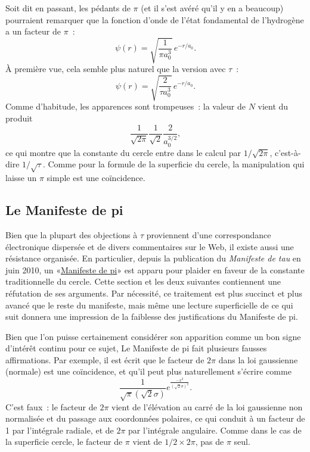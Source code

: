 Soit dit en passant, les pédants de $\pi$ (et il s'est avéré qu'il y en a beaucoup) pourraient
remarquer que la fonction d'onde de l'état fondamental de l'hydrogène a un
facteur de $\pi$~:
\[
\psi(r) = \sqrt{\frac{1}{\pi a_0^3}}\,e^{-r/a_0}.
\]
À première vue, cela semble plus naturel que la version avec $\tau$~:
\[
\psi(r) = \sqrt{\frac{2}{\tau a_0^3}}\,e^{-r/a_0}.
\]
Comme d'habitude, les apparences sont trompeuses~: la valeur de $N$ vient du
produit
\[
\frac{1}{\sqrt{2\pi}} \frac{1}{\sqrt{2}} \frac{2}{a_0^{3/2}},
\]
ce qui montre que la constante du cercle entre dans le calcul par
$1/\sqrt{2\pi}$, c'est-à-dire $1/\sqrt{\tau}$. Comme pour la formule de la
superficie du cercle, la manipulation qui laisse un $\pi$ simple est une
coïncidence.


  \subsection{Le Manifeste de pi} %
  \label{sec:the_pi_manifesto_a_rebuttal}

Bien que la plupart des objections à $\tau$ proviennent d'une correspondance
électronique dispersée et de divers commentaires sur le Web, il existe aussi une
résistance organisée. En particulier, depuis la publication du \emph{Manifeste
de tau} en juin 2010, un «\ns \href{http://thepimanifesto.com/}{Manifeste de
pi}\ns » est apparu pour plaider en faveur de la constante traditionnelle du
cercle. Cette section et les deux suivantes contiennent une réfutation de ses
arguments. Par nécessité, ce traitement est plus succinct et plus avancé que le
reste du manifeste, mais même une lecture superficielle de ce qui suit donnera
une impression de la faiblesse des justifications du Manifeste de pi.

Bien que l'on puisse certainement considérer son apparition
comme un bon signe d'intérêt continu pour ce sujet, Le Manifeste de pi fait plusieurs fausses
affirmations. Par exemple, il est écrit que le facteur de $2\pi$ dans la loi
gaussienne (normale) est une coïncidence, et qu'il peut plus naturellement
s'écrire comme
\[
\frac{1}{\sqrt\pi(\sqrt 2\sigma)}e^{\frac{-x^2}{(\sqrt 2\sigma)^2}}.
\]
C'est faux~: le facteur de $2\pi$ vient de l'élévation au carré de la loi
gaussienne non normalisée et du passage aux coordonnées polaires, ce qui conduit
à un facteur de 1 par l'intégrale radiale, et de $2\pi$ par l'intégrale angulaire. Comme
dans le cas de la superficie cercle, le facteur de $\pi$ vient de $1/2\times
2\pi$, pas de $\pi$ seul.

